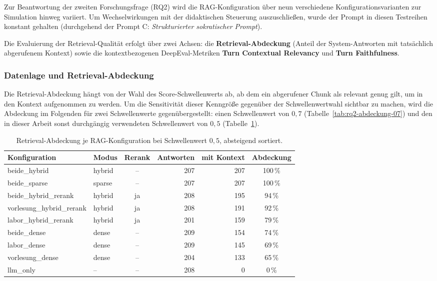 Zur Beantwortung der zweiten Forschungsfrage (RQ2) wird die RAG-Konfiguration über neun
verschiedene Konfigurationsvarianten zur Simulation hinweg variiert. Um Wechselwirkungen mit der didaktischen Steuerung
auszuschließen, wurde der Prompt in diesen Testreihen konstant gehalten (durchgehend der Prompt C: \emph{Strukturierter sokratischer Prompt}).

Die Evaluierung der Retrieval-Qualität erfolgt über zwei Achsen: die \textbf{Retrieval-Abdeckung}
(Anteil der System-Antworten mit tatsächlich abgerufenem Kontext) sowie die kontextbezogenen
DeepEval-Metriken \textbf{Turn Contextual Relevancy} und \textbf{Turn Faithfulness}.

\subsubsection{Datenlage und Retrieval-Abdeckung}
Die Retrieval-Abdeckung hängt von der Wahl des Score-Schwellenwerts ab, ab dem ein abgerufener
Chunk als \glqq relevant genug\grqq{} gilt, um in den Kontext aufgenommen zu werden. Um die
Sensitivität dieser Kenngröße gegenüber der Schwellenwertwahl sichtbar zu machen, wird die
Abdeckung im Folgenden für zwei Schwellenwerte gegenübergestellt: einen Schwellenwert von
$0{,}7$ (Tabelle~\ref{tab:rq2-abdeckung-07}) und den in dieser Arbeit sonst durchgängig verwendeten
Schwellenwert von $0{,}5$ (Tabelle~\ref{tab:rq2-abdeckung-05}).

\begin{table}[htbp]
  \centering
  \small
  \caption{Retrieval-Abdeckung je RAG-Konfiguration bei Schwellenwert $0{,}5$, absteigend sortiert.}
  \label{tab:rq2-abdeckung-05}
  \begin{tabular}{llcrrc}
    \toprule
    \textbf{Konfiguration} & \textbf{Modus} & \textbf{Rerank} & \textbf{Antworten} & \textbf{mit Kontext} & \textbf{Abdeckung}\\
    \midrule
    beide\_hybrid             & hybrid & --  & 207 & 207 & 100\,\%\\
    beide\_sparse             & sparse & --  & 207 & 207 & 100\,\%\\
    beide\_hybrid\_rerank     & hybrid & ja  & 208 & 195 & 94\,\%\\
    vorlesung\_hybrid\_rerank & hybrid & ja  & 208 & 191 & 92\,\%\\
    labor\_hybrid\_rerank     & hybrid & ja  & 201 & 159 & 79\,\%\\
    beide\_dense              & dense  & --  & 209 & 154 & 74\,\%\\
    labor\_dense              & dense  & --  & 209 & 145 & 69\,\%\\
    vorlesung\_dense          & dense  & --  & 204 & 133 & 65\,\%\\
    llm\_only                 & --     & --  & 208 &   0 &  0\,\%\\
    \bottomrule
  \end{tabular}
\end{table}

